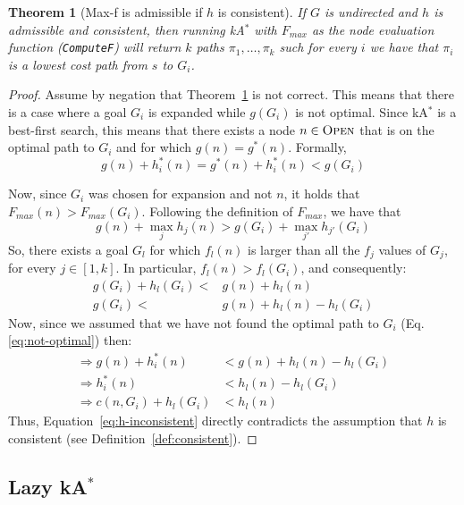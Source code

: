 \documentclass{aicom2e}
\newtheorem{theorem}{Theorem}
\newcommand{\kastar}{kA$^*$}
\newcommand{\maxf}{Max-f}
\newcommand{\open}{\textsc{Open}}
\begin{document}
 
\begin{theorem}[\maxf{} is admissible if $h$ is consistent]
If $G$ is undirected and $h$ is admissible and consistent, 
then running \kastar{} with $F_{max}$ 
as the node evaluation function ({\tt ComputeF}) 
will return $k$ paths $\pi_1,\ldots, \pi_k$ such for every $i$ we have that $\pi_i$ is a lowest cost path from $s$ to $G_i$. 
\label{the:max-f}
\end{theorem}
 \begin{proof}
 Assume by negation that Theorem~\ref{the:max-f} is not correct. This means
 that there is a case where a goal $G_i$ is expanded while $g(G_i)$ is not optimal. Since \kastar{} is a best-first search, this means that there exists a node $n\in \open{}$ that is on the optimal path to $G_i$ and for which $g(n)=g^*(n)$. Formally, 
 \begin{equation}
     g(n)+h_i^*(n) = g^*(n)+h_i^*(n) < g(G_i)
    \label{eq:not-optimal}
 \end{equation}
 
 Now, since $G_i$ was chosen for expansion and not $n$, it holds that $F_{max}(n)  > F_{max}(G_i)$. Following the definition of $F_{max}$, we have that
 \begin{equation}
     g(n)+\max_j h_j(n) > g(G_i) + \max_{j'} h_{j'}(G_i)
 \end{equation}
 So, there exists a goal $G_l$ for which $f_l(n)$ is larger than 
 all the $f_j$ values of $G_j$, for every $j\in [1,k]$. In particular, 
 $f_l(n)>f_l(G_i)$, and consequently:
 \begin{align}
     g(G_i)+h_l(G_i) < & g(n)+h_l(n) \\
     g(G_i) < & g(n)+h_l(n) - h_l(G_i) 
 \end{align} 
Now, since we assumed that we have not found the optimal path to $G_i$ (Eq.~ \ref{eq:not-optimal}) then:
\begin{align}
\Rightarrow g(n)+h^*_i(n)  & < g(n)+h_l(n) - h_l(G_i)\\
\Rightarrow h^*_i(n)  & < h_l(n) - h_l(G_i)\\
\Rightarrow c(n,G_i) + h_l(G_i) & < h_l(n) \label{eq:h-inconsistent} 
\end{align}
Thus, Equation~\ref{eq:h-inconsistent} directly contradicts the assumption
that $h$ is consistent (see Definition~\ref{def:consistent}). 
\end{proof} 




\subsection{Lazy \kastar{}}
\label{sec:lazy}
\end{document}
